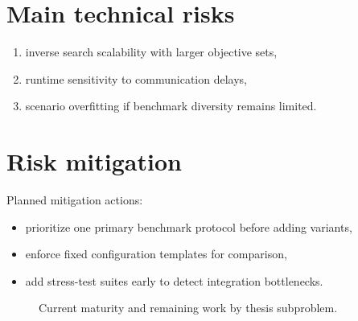 \section{Main technical risks}

\begin{enumerate}
    \item inverse search scalability with larger objective sets,
    \item runtime sensitivity to communication delays,
    \item scenario overfitting if benchmark diversity remains limited.
\end{enumerate}

\section{Risk mitigation}

Planned mitigation actions:

\begin{itemize}
    \item prioritize one primary benchmark protocol before adding variants,
    \item enforce fixed configuration templates for comparison,
    \item add stress-test suites early to detect integration bottlenecks.
\end{itemize}

\begin{figure}[tbp]
    \centering
    \caption{Current maturity and remaining work by thesis subproblem.}
    \label{fig:progress_tracker}
\end{figure}
